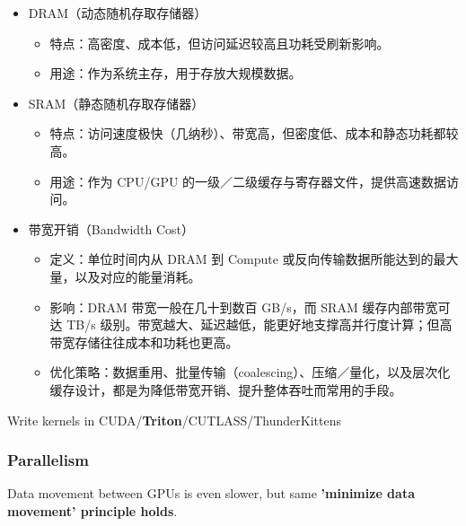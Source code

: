 \begin{itemize}[leftmargin=*]
  \item DRAM（动态随机存取存储器）
    \begin{itemize}[leftmargin=1.5em,noitemsep]
      \item 特点：高密度、成本低，但访问延迟较高且功耗受刷新影响。
      \item 用途：作为系统主存，用于存放大规模数据。
    \end{itemize}

  \item SRAM（静态随机存取存储器）
    \begin{itemize}[leftmargin=1.5em,noitemsep]
      \item 特点：访问速度极快（几纳秒）、带宽高，但密度低、成本和静态功耗都较高。
      \item 用途：作为 CPU/GPU 的一级／二级缓存与寄存器文件，提供高速数据访问。
    \end{itemize}

  \item 带宽开销（Bandwidth Cost）
    \begin{itemize}[leftmargin=1.5em,noitemsep]
      \item 定义：单位时间内从 DRAM 到 Compute 或反向传输数据所能达到的最大量，以及对应的能量消耗。
      \item 影响：DRAM 带宽一般在几十到数百 GB/s，而 SRAM 缓存内部带宽可达 TB/s 级别。带宽越大、延迟越低，能更好地支撑高并行度计算；但高带宽存储往往成本和功耗也更高。
      \item 优化策略：数据重用、批量传输（coalescing）、压缩／量化，以及层次化缓存设计，都是为降低带宽开销、提升整体吞吐而常用的手段。
    \end{itemize}
\end{itemize}


Write kernels in CUDA/\textbf{Triton}/CUTLASS/ThunderKittens


\subsubsection{Parallelism}
{\color{tred}Data movement between GPUs is even slower, but same \textbf{'minimize data movement' principle holds}.}

